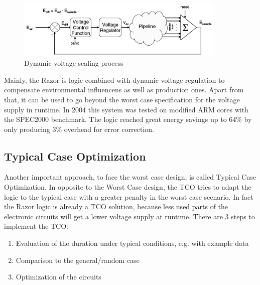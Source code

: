 \documentclass[12pt, a4paper]{article}
\begin{document}
	\begin{figure}[ht]
		\begin{center}
			\includegraphics[width=10cm]{sum.png}
		\end{center}
		\caption{Dynamic voltage scaling process\cite{picr}
			\label{fig:sum}}
	\end{figure}
	\newline
	Mainly, the Razor is logic combined with dynamic voltage regulation to compensate environmental influencens as well as production ones. Apart from that, it can be used to go beyond the worst case specification for the voltage supply in runtime.
	In 2004 this system was tested on modified ARM cores with the SPEC2000 benchmark. The logic reached great energy savings up to 64\% by only producing 3\% overhead for error correction.\cite{picr}
	\subsection{Typical Case Optimization}
	Another important approach, to face the worst case design, is called Typical Case Optimization. In opposite to the Worst Case design, the TCO tries to adapt the logic to the typical case with a greater penalty in the worst case scenario. In fact the Razor logic is already a TCO solution, because less used parts of the electronic circuits will get a lower voltage supply at runtime.
	There are 3 steps to implement the TCO\cite{austin}: 
	\begin{enumerate}
		\item Evaluation of the duration under typical conditions, e.g. with example data
		\item Comparison to the general/random case
		\item Optimization of the circuits
	\end{enumerate}
	
\end{document}
